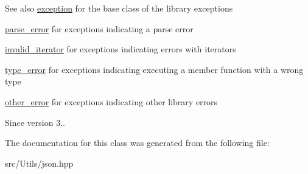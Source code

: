 \begin{DoxySeeAlso}{See also}
\mbox{\hyperlink{classnlohmann_1_1detail_1_1exception}{exception}} for the base class of the library exceptions 

\mbox{\hyperlink{classnlohmann_1_1detail_1_1parse__error}{parse\+\_\+error}} for exceptions indicating a parse error 

\mbox{\hyperlink{classnlohmann_1_1detail_1_1invalid__iterator}{invalid\+\_\+iterator}} for exceptions indicating errors with iterators 

\mbox{\hyperlink{classnlohmann_1_1detail_1_1type__error}{type\+\_\+error}} for exceptions indicating executing a member function with a wrong type 

\mbox{\hyperlink{classnlohmann_1_1detail_1_1other__error}{other\+\_\+error}} for exceptions indicating other library errors
\end{DoxySeeAlso}
\begin{DoxySince}{Since}
version 3.. 
\end{DoxySince}


The documentation for this class was generated from the following file\+:\begin{DoxyCompactItemize}
\item 
src/\+Utils/json.\+hpp\end{DoxyCompactItemize}

